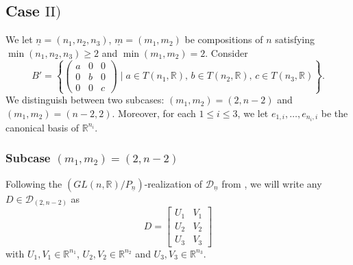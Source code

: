 \documentclass[pdftex]{sigma}
\numberwithin{equation}{section}
\theoremstyle{definition}
\newcommand{\R}{\mathbb{R}}
\newcommand{\D}{\mathcal{D}}
\newcommand{\T}{T}
\theoremstyle{plain}
\theoremstyle{plain}
\theoremstyle{plain}
\theoremstyle{plain}
\begin{document}
\subsection[Case II)]{Case $\mathrm{II})$} \label{cas 2}

We let $\underline n = (n_1,n_2,n_3)$, $\underline m = (m_1,m_2)$ be compositions of $n$ satisfying $\min(n_1,n_2,n_3) \geqslant 2$ and $\min(m_1,m_2) = 2$. Consider
\begin{equation*}
	B' = \left\{\begin{pmatrix}
	a & 0 & 0 \\
	0 & b & 0 \\
	0 & 0 & c
\end{pmatrix} \mid a \in \T(n_1,\R), \, b \in \T(n_2,\R), \, c \in \T(n_3,\R)\right\}.
\end{equation*}
We distinguish between two subcases: $(m_1,m_2) = (2,n-2)$ and $(m_1,m_2) = (n-2,2)$. Moreover, for each $1 \leqslant i \leqslant 3$, we let $e_{1,i},\dots,e_{n_i,i}$ be the canonical basis of $\R^{n_i}$.

\subsubsection*{Subcase $(m_1,m_2) = (2,n-2)$}

Following the $(GL(n,\R)/P_{\underline n})$-realization of $\D_{\underline n}$ from , we will write any $D \in \D_{(2,n-2)}$ as
\begin{equation*}
	D = \begin{bmatrix}
	U_1 & V_1 \\
	U_2 & V_2 \\
	U_3 & V_3
\end{bmatrix}
\end{equation*}
with $U_1,V_1 \in \R^{n_1}$, $U_2,V_2 \in \R^{n_2}$ and $U_3,V_3 \in \R^{n_3}$.

\end{document}
